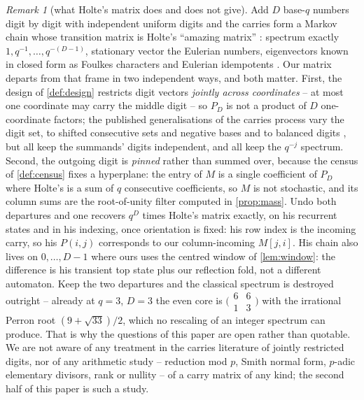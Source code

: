 \documentclass[11pt]{amsart}
\theoremstyle{definition}
\theoremstyle{remark}
\newtheorem{remark}[theorem]{Remark}
\begin{document}
\begin{remark}[what Holte's matrix does and does not give]
\label{rem:holte}
Add $D$ base-$q$ numbers digit by digit with independent uniform digits and the carries form a Markov chain whose transition matrix is Holte's ``amazing matrix'' \cite{holte}: spectrum exactly $1, q^{-1}, \dots, q^{-(D-1)}$, stationary vector the Eulerian numbers, eigenvectors known in closed form as Foulkes characters and Eulerian idempotents \cite{df09,df12}. Our matrix departs from that frame in two independent ways, and both matter. First, the design of \cref{def:design} restricts digit vectors \emph{jointly across coordinates} -- at most one coordinate may carry the middle digit -- so $P_D$ is not a product of $D$ one-coordinate factors; the published generalisations of the carries process vary the digit set, to shifted consecutive sets and negative bases \cite{ns14} and to balanced digits \cite{df14}, but all keep the summands' digits independent, and all keep the $q^{-j}$ spectrum. Second, the outgoing digit is \emph{pinned} rather than summed over, because the census of \cref{def:census} fixes a hyperplane: the entry of $M$ is a single coefficient of $P_D$ where Holte's is a sum of $q$ consecutive coefficients, so $M$ is not stochastic, and its column sums are the root-of-unity filter computed in \cref{prop:mass}. Undo both departures and one recovers $q^D$ times Holte's matrix exactly, on his recurrent states and in his indexing, once orientation is fixed: his row index is the incoming carry, so his $P(i,j)$ corresponds to our column-incoming $M[j,i]$. His chain also lives on $0, \dots, D-1$ where ours uses the centred window of \cref{lem:window}: the difference is his transient top state plus our reflection fold, not a different automaton. Keep the two departures and the classical spectrum is destroyed outright -- already at $q = 3$, $D = 3$ the even core is $\bigl(\begin{smallmatrix}6&6\\1&3\end{smallmatrix}\bigr)$ with the irrational Perron root $(9+\sqrt{33})/2$, which no rescaling of an integer spectrum can produce. That is why the questions of this paper are open rather than quotable. We are not aware of any treatment in the carries literature of jointly restricted digits, nor of any arithmetic study -- reduction mod $p$, Smith normal form, $p$-adic elementary divisors, rank or nullity -- of a carry matrix of any kind; the second half of this paper is such a study.
\end{remark}
\end{document}
